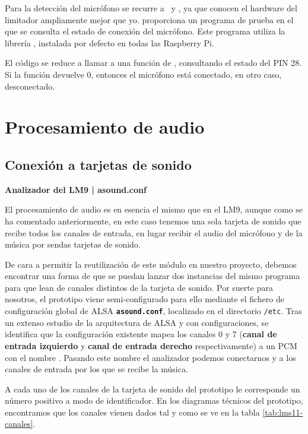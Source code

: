 Para la detección del micrófono se recurre a \myMateLuis\ y \myProf, ya que conocen el hardware del limitador ampliamente mejor que yo. \myMateLuis proporciona un programa de prueba en el que se consulta el estado de conexión del micrófono. Este programa utiliza la librería , instalada por defecto en todas las Raspberry Pi.

El código se reduce a llamar a una función de , consultando el estado del PIN 28. Si la función devuelve 0, entonces el micrófono está conectado, en otro caso, desconectado. \cite{wiringpi}

\section{Procesamiento de audio}

\subsection{Conexión a tarjetas de sonido}

\begin{flushright}
\textbf{Analizador del LM9 | asound.conf}
\end{flushright}

El procesamiento de audio es en esencia el mismo que en el \acrshort{LM9}, aunque como se ha comentado anteriormente, en este caso tenemos una sola tarjeta de sonido que recibe todos los canales de entrada, en lugar recibir el audio del micrófono y de la música por sendas tarjetas de sonido.

De cara a permitir la reutilización de este módulo en nuestro proyecto, debemos encontrar una forma de que se puedan lanzar dos instancias del mismo programa para que lean de canales distintos de la tarjeta de sonido. Por suerte para nosotros, el prototipo viene semi-configurado para ello mediante el fichero de configuración global de \acrshort{ALSA} \textbf{\texttt{asound.conf}}, localizado en el directorio \texttt{/etc}. Tras un extenso estudio de la arquitectura de \acrshort{ALSA} y con configuraciones, se identifica que la configuración existente mapea los canales 0 y 7 (\textbf{canal de entrada izquierdo} y \textbf{canal de entrada derecho} respectivamente) a un \acrshort{PCM} \cite{alsa-pcm} con el nombre . Pasando este nombre el analizador podemos conectarnos y a los canales de entrada por los que se recibe la música.

A cada uno de los canales de la tarjeta de sonido del prototipo le corresponde un número positivo a modo de identificador. En los diagramas técnicos del prototipo, encontramos que los canales vienen dados tal y como se ve en la tabla \ref{tab:lms11-canales}.

